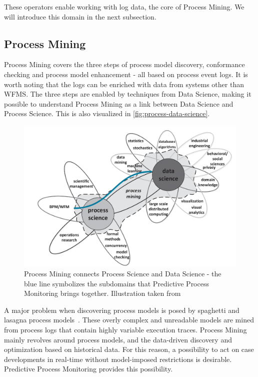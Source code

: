 These operators enable working with log data, the core of Process Mining.
We will introduce this domain in the next subsection.

\subsection{Process Mining}\label{sec:process-mining}
Process Mining covers the three steps of process model discovery, conformance checking and process model enhancement \cite{Aalst2016} -  all based on process event logs. It is worth noting that the logs can be enriched with data from systems other than WFMS. The three steps are enabled by techniques from Data Science, making it possible to understand Process Mining as a link between Data Science and Process Science. This is also visualized in \autoref{fig:process-data-science}.

\begin{figure}[!htb]
    \centering
    \includegraphics[width=.8\textwidth]{gfx/process-data-science.png}
    \caption[Process Mining connects two disciplines]{Process Mining connects Process Science and Data Science - the blue line symbolizes the subdomains that Predictive Process Monitoring brings together. Illustration taken from~\cite[p.18]{Aalst2016}}
    \label{fig:process-data-science}
\end{figure}

A major problem when discovering process models is posed by spaghetti and lasagna process models~\cite{Aalst2016}. These overly complex and unreadable models are mined from process logs that contain highly variable execution traces. Process Mining mainly revolves around process models, and the data-driven discovery and optimization based on historical data. For this reason, a possibility to act on case developments in real-time without model-imposed restrictions is desirable. Predictive Process Monitoring provides this possibility.

